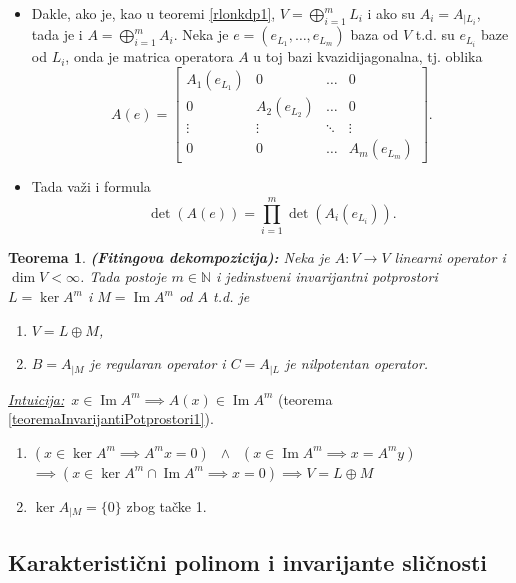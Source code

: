 \documentclass[a4paper,12pt,twoside]{report}
\newtheorem{theorem}{Teorema}[section]
\numberwithin{algorithm}{section}
\newcommand{\intuicija}{\noindent\underline{\textit{Intuicija:}}\ }
\begin{document}
\begin{itemize}
    \item Dakle, ako je, kao u teoremi \ref{rlonkdp1}, $V = \bigoplus^m_{i=1} L_i$ i ako su $A_i = A_{|L_i}$, tada je
    i $A = \bigoplus^m_{i=1} A_i$. Neka je $e = (e_{L_1}, \dots, e_{L_m})$ baza od $V$ t.d. su $e_{L_i}$ baze od $L_i$, onda
    je matrica operatora $A$ u toj bazi kvazidijagonalna, tj. oblika
    \[ A(e) = \begin{bmatrix}
        A_1(e_{L_1}) & 0 & \dots & 0 \\
        0 & A_2(e_{L_2}) & \dots & 0 \\
        \vdots & \vdots & \ddots & \vdots \\
        0 & 0 & \dots & A_m(e_{L_m})
    \end{bmatrix}. \]
    \item Tada važi i formula
    \[ \det (A(e)) = \prod^m_{i=1} \det(A_i(e_{L_i})). \]
\end{itemize}

\begin{theorem}
    \textbf{(Fitingova dekompozicija):} Neka je $A: V \to V$ linearni operator i $\dim V < \infty$. Tada postoje $m \in \mathbb{N}$
    i jedinstveni invarijantni potprostori $L = \ker A^m$ i $M = \operatorname{Im}A^m$ od $A$ t.d. je 
    \begin{enumerate}
        \item $V = L \oplus M$,
        \item $B = A_{|M}$ je regularan operator i $C = A_{|L}$ je nilpotentan operator.
    \end{enumerate}
\end{theorem}

\intuicija $x \in \operatorname{Im}A^m \implies A(x) \in \operatorname{Im}A^m$ (teorema \ref{teoremaInvarijantiPotprostori1}).
\begin{enumerate}
    \item $(x \in \ker A^m \implies A^m x = 0) \;\; \land \;\; (x \in \operatorname{Im} A^m \implies x = A^m y)$\\
    $\implies (x \in \ker A^m \cap \operatorname{Im}A^m \implies x = 0) \implies V = L \oplus M$
    \item $\ker A_{|M} = \{0\}$ zbog tačke 1.
\end{enumerate}

\subsection{Karakteristični polinom i invarijante sličnosti}
\end{document}
